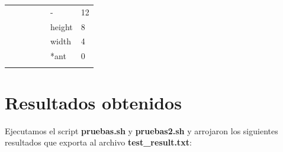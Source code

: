 \documentclass[a4paper, 10pt, twoside, notitlepage]{article}
\begin{document}
\begin{table}[htp]
\begin{tabular}{cccllll}
                                           &                                  &                               & \multicolumn{1}{l|}{} & \multicolumn{1}{l|}{}                     & \multicolumn{1}{l|}{-}        & \multicolumn{1}{l|}{12}       \\ \cline{6-7} 
                                           &                                  &                               & \multicolumn{1}{l|}{} & \multicolumn{1}{l|}{}                     & \multicolumn{1}{l|}{height}   & \multicolumn{1}{l|}{8}        \\ \cline{6-7} 
\multicolumn{1}{l}{}                       & \multicolumn{1}{l}{}             & \multicolumn{1}{l}{}          & \multicolumn{1}{l|}{} & \multicolumn{1}{l|}{}                     & \multicolumn{1}{l|}{width}    & \multicolumn{1}{l|}{4}        \\ \cline{6-7} 
\multicolumn{1}{l}{}                       & \multicolumn{1}{l}{}             & \multicolumn{1}{l}{}          & \multicolumn{1}{l|}{} & \multicolumn{1}{l|}{}                     & \multicolumn{1}{l|}{*ant}     & \multicolumn{1}{l|}{0}        \\ \cline{5-7} 
\multicolumn{1}{l}{}                       & \multicolumn{1}{l}{}             & \multicolumn{1}{l}{}          &                       &                                           &                               &                              
\end{tabular}
\end{table}

\newpage
\section{Resultados obtenidos}
Ejecutamos el script \textbf{pruebas.sh} y \textbf{pruebas2.sh} y arrojaron los siguientes resultados que exporta al archivo \textbf{test\_result.txt}:
\end{document}
